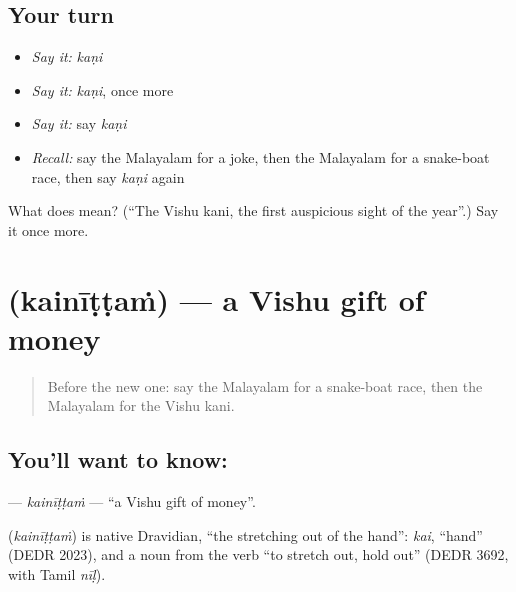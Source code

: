 \subsection*{Your turn}
\begin{itemize}
\raggedright
  \item \emph{Say it:} \emph{kaṇi}
  \item \emph{Say it:} \emph{kaṇi}, once more
  \item \emph{Say it:} say \emph{kaṇi}
  \item \emph{Recall:} say the Malayalam for a joke, then the Malayalam for a snake-boat race, then say \emph{kaṇi} again
\end{itemize}

\begin{tcolorbox}[breakable,colback=teal!4,colframe=teal!35!black,title={Before you move on}]
What does  mean? (\textquotedblleft{}The Vishu kani, the first auspicious sight of the year\textquotedblright{}.) Say it once more.
\end{tcolorbox}
\section[\texorpdfstring{\ml{കൈനീട്ടം} (kainīṭṭaṁ)}{കൈനീട്ടം (kainīṭṭaṁ)}]{ (kainīṭṭaṁ) — a Vishu gift of money}

\label{lesson:ML-C252-kainittam}



\begin{quote}
Before the new one: say the Malayalam for a snake-boat race, then the Malayalam for the Vishu kani.
\end{quote}

\subsection*{You'll want to know: }
\textbf{} — \emph{kainīṭṭaṁ} — \textquotedblleft{}a Vishu gift of money\textquotedblright{}.

\begin{cousinweb}
\textbf{} (\emph{kainīṭṭaṁ}) is native Dravidian, \textquotedblleft{}the stretching out of the hand\textquotedblright{}: \emph{kai}, \textquotedblleft{}hand\textquotedblright{} (DEDR 2023), and a noun from the verb \textquotedblleft{}to stretch out, hold out\textquotedblright{} (DEDR 3692, with Tamil \emph{nīḷ}).
\end{cousinweb}

